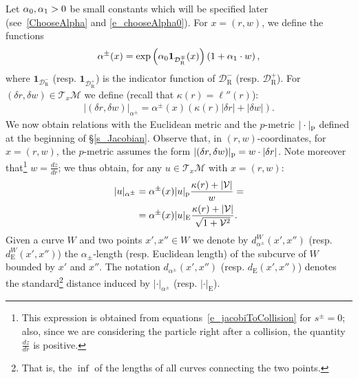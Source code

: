 \documentclass[10pt]{amsart}
\theoremstyle{definition}\newtheorem{defi}[theo]{Definition}\newtheorem{rema}[theo]{Remark}\newtheorem{exam}[theo]{Example}\newtheorem{exem}[theo]{Example}\newtheorem{nota}[theo]{Notation}
\newcommand{\ct}{r}
\newcommand{\curv}{\kappa}
\newcommand{\cslope}{\mathcal{V}}
\newcommand{\tang}{\mathcal{T}}
\newcommand{\cell}{\mathcal{D}}
\newcommand{\csp}{\mathcal{M}}
\newcommand{\recoPrivate}{\mathrm{R}}
\newcommand{\reco}{{\cell^-_{\recoPrivate}}}
\newcommand{\backReco}{{\cell^+_{\recoPrivate}}}
\newcommand{\recoMp}{{\cell^\mp_{\recoPrivate}}}
\newcommand{\deum}[1]{d\eum^{#1}}
\newcommand{\eum}{_\text{E}}
\newcommand{\pme}{_\textup{p}}
\newcommand{\admPm}{_{\alpha^{\pm}}}
\newcommand{\admFuncPm}{\alpha^{\pm}}
\newcommand\admParam[1]{
\ifnum0=#1\relax
\alpha_0
\else
\ifnum1=#1\relax
\alpha_1\fi\fi}
\newcommand{\If}{\boldsymbol{1}}
\begin{document}
Let $\admParam0,\admParam1 > 0$ be small constants which will be specified later (see~\eqref{ChooseAlpha} and \eqref{e_chooseAlpha0}). For $x = (\ct,w)$, we define the functions
\begin{align*}
\admFuncPm(x) = \exp\left(\admParam0\If_\recoMp(x)\right)\left(1+\admParam1\cdot w\right),
\end{align*}
where $\If_\reco$ (resp. $\If_{\backReco}$) is the indicator function of $\reco$ (resp. $\backReco$). For $(\delta\ct,\delta w)\in\tang_x\csp$ we define (recall that $\curv(\ct) = \ell''(\ct)$):
\begin{align}\label{eq:def-adm-metric}
|(\delta \ct, \delta w)|\admPm=\admFuncPm(x)(\curv(\ct) |\delta\ct|+|\delta w|).
\end{align}
We now obtain relations with the Euclidean metric and the $p$-metric $|\cdot|\pme$ defined at the beginning of
\S\ref{s_Jacobian}. Observe that, in $(r,w)$-coordinates, for $x = (r,w)$, the $p$-metric assumes the form $|(\delta\ct,\delta w)|\pme = w\cdot |\delta\ct|$. Note moreover that\footnote{ This expression is obtained from equations~\eqref{e_jacobiToCollision} for $s^{\pm} = 0$; also, since we are considering the particle right after a collision, the quantity $\frac{dz}{d\ct}$ is positive.} $w=\frac{dz}{d\ct}$; we thus obtain, for any $u\in\tang_{x}\csp$ with $x = (\ct,w)$:
\begin{subequations}\label{e_defAdm}
\begin{align}
|u|\admPm
&= \admFuncPm(x)|u|\pme\frac{\curv(\ct)+|\cslope|}{w} =\label{e_defAdmP}
\\%
&= \admFuncPm(x)|u|\eum\frac{\curv(\ct)+|\cslope|}{\sqrt{1 +\cslope^2}}.\label{e_defAdmE}
\end{align}
\end{subequations}
Given a curve $W$ and two points $x',x''\in W$ we denote by $d\admPm^{W}(x',x'')$ (resp. $\deum{W}(x',x'')$) the $\alpha_{\pm}$-length (resp. Euclidean length) of the subcurve of $W$ bounded by $x'$ and $x''$. The notation $d\admPm(x',x'')$ (resp. $\deum{}(x',x'')$) denotes the standard\footnote{ That is, the $\inf$ of the lengths of all curves connecting the two points.} distance induced by $|\cdot|\admPm$ (resp. $|\cdot|\eum$).
\end{document}
